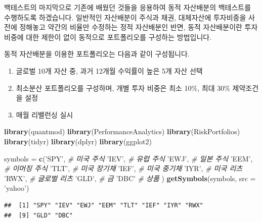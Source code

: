 \documentclass[12pt,]{book}
\newenvironment{Shaded}{\begin{snugshade}}{\end{snugshade}}
\newcommand{\CommentTok}[1]{\textcolor[rgb]{0.56,0.35,0.01}{\textit{#1}}}
\newcommand{\DataTypeTok}[1]{\textcolor[rgb]{0.13,0.29,0.53}{#1}}
\newcommand{\KeywordTok}[1]{\textcolor[rgb]{0.13,0.29,0.53}{\textbf{#1}}}
\newcommand{\NormalTok}[1]{#1}
\newcommand{\StringTok}[1]{\textcolor[rgb]{0.31,0.60,0.02}{#1}}
\providecommand{\tightlist}{%
  \setlength{\itemsep}{0pt}\setlength{\parskip}{0pt}}
\begin{document}
백테스트의 마지막으로 기존에 배웠던 것들을 응용하여 동적 자산배분의 백테스트를 수행하도록 하겠습니다. 일반적인 자산배분이 주식과 채권, 대체자산에 투자비중을 사전에 정해놓고 약간의 비율만 수정하는 정적 자산배분인 반면, 동적 자산배분이란 투자비중에 대한 제한이 없이 동적으로 포트폴리오를 구성하는 방법입니다.

동적 자산배분을 이용한 포트폴리오는 다음과 같이 구성됩니다.

\begin{enumerate}
\def\labelenumi{\arabic{enumi}.}
\tightlist
\item
  글로벌 10개 자산 중, 과거 12개월 수익률이 높은 5개 자산 선택
\item
  최소분산 포트폴리오를 구성하며, 개별 투자 비중은 최소 10\%, 최대 30\% 제약조건을 설정
\item
  매월 리밸런싱 실시
\end{enumerate}

\begin{Shaded}
\begin{Highlighting}[]
\KeywordTok{library}\NormalTok{(quantmod)}
\KeywordTok{library}\NormalTok{(PerformanceAnalytics)}
\KeywordTok{library}\NormalTok{(RiskPortfolios)}
\KeywordTok{library}\NormalTok{(tidyr)}
\KeywordTok{library}\NormalTok{(dplyr)}
\KeywordTok{library}\NormalTok{(ggplot2)}

\NormalTok{symbols =}\StringTok{ }\KeywordTok{c}\NormalTok{(}\StringTok{'SPY'}\NormalTok{, }\CommentTok{# 미국 주식}
            \StringTok{'IEV'}\NormalTok{, }\CommentTok{# 유럽 주식 }
            \StringTok{'EWJ'}\NormalTok{, }\CommentTok{# 일본 주식}
            \StringTok{'EEM'}\NormalTok{, }\CommentTok{# 이머징 주식}
            \StringTok{'TLT'}\NormalTok{, }\CommentTok{# 미국 장기채}
            \StringTok{'IEF'}\NormalTok{, }\CommentTok{# 미국 중기채}
            \StringTok{'IYR'}\NormalTok{, }\CommentTok{# 미국 리츠}
            \StringTok{'RWX'}\NormalTok{, }\CommentTok{# 글로벌 리츠}
            \StringTok{'GLD'}\NormalTok{, }\CommentTok{# 금}
            \StringTok{'DBC'}  \CommentTok{# 상품}
\NormalTok{            )}
\KeywordTok{getSymbols}\NormalTok{(symbols, }\DataTypeTok{src =} \StringTok{'yahoo'}\NormalTok{)}
\end{Highlighting}
\end{Shaded}

\begin{verbatim}
##  [1] "SPY" "IEV" "EWJ" "EEM" "TLT" "IEF" "IYR" "RWX"
##  [9] "GLD" "DBC"
\end{verbatim}
\end{document}
